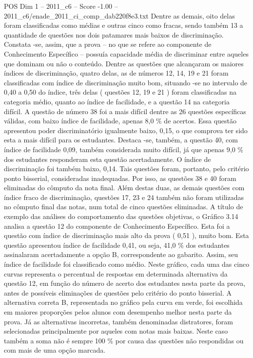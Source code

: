 \begin{textsample}{POS Dim 1 – 2011\_c6 – Score -1.00 – 2011\_c6/enade\_2011\_ci\_comp\_dab220f8e3.txt}
Dentre as demais, oito delas foram classificadas como médias e outras cinco como fracas, sendo também 13 a quantidade de questões nos dois patamares mais baixos de discriminação.
Constata -se, assim, que a prova – no que se refere ao componente de Conhecimento Específico – possuía capacidade média de discriminar entre aqueles que dominam ou não o conteúdo.
Dentre as questões que alcançaram os maiores índices de discriminação, quatro delas, as de números 12, 14, 19 e 21 foram classificadas com índice de discriminação muito bom, situando -se no intervalo de 0,40 a 0,50 do índice, três delas ( questões 12, 19 e 21 ) foram classificadas na categoria médio, quanto ao índice de facilidade, e a questão 14 na categoria difícil.
A questão de número 38 foi a mais difícil dentre as 26 questões específicas válidas, com baixo índice de facilidade, apenas 8,0 \% de acertos.
Essa questão apresentou poder discriminatório igualmente baixo, 0,15, o que comprova ter sido esta a mais difícil para os estudantes.
Destaca -se, também, a questão 40, com índice de facilidade 0,09, também considerada muito difícil, já que apenas 9,0 \% dos estudantes responderam esta questão acertadamente.
O índice de discriminação foi também baixo, 0,14.
Tais questões foram, portanto, pelo critério ponto bisserial, consideradas inadequadas.
Por isso, as questões 38 e 40 foram eliminadas do cômputo da nota final.
Além destas duas, as demais questões com índice fraco de discriminação, questões 17, 23 e 24 também não foram utilizadas no cômputo final das notas, num total de cinco questões eliminadas.
A título de exemplo das análises do comportamento das questões objetivas, o Gráfico 3.14 analisa a questão 12 do componente de Conhecimento Específico.
Esta foi a questão com índice de discriminação mais alto da prova ( 0,51 ), muito bom.
Esta questão apresentou índice de facilidade 0,41, ou seja, 41,0 \% dos estudantes assinalaram acertadamente a opção B, correspondente ao gabarito.
Assim, seu índice de facilidade foi classificado como médio.
Neste gráfico, cada uma das cinco curvas representa o percentual de respostas em determinada alternativa da questão 12, em função do número de acerto dos estudantes nesta parte da prova, antes de possíveis eliminações de questões pelo critério do ponto bisserial.
A alternativa correta B, representada no gráfico pela curva em verde, foi escolhida em maiores proporções pelos alunos com desempenho melhor nesta parte da prova.
Já as alternativas incorretas, também denominadas distratores, foram selecionadas principalmente por aqueles com notas mais baixas.
Neste caso também a soma não é sempre 100 \% por causa das questões não respondidas ou com mais de uma opção marcada.

\end{textsample}
